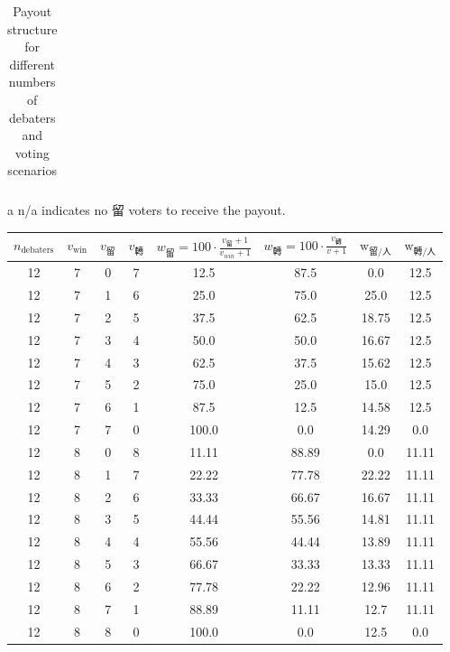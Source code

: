 \documentclass[9pt]{article}
\begin{document}
\begin{table}[h]
\begin{threeparttable}
\begin{tabular}{cccccccc}
\bottomrule
\end{tabular}
\begin{tablenotes}
    \item[a] n/a indicates no 留 voters to receive the payout.
\end{tablenotes}
\caption{Payout structure for different numbers of debaters and voting scenarios}
\end{threeparttable}
\end{table}




\begin{table}[h]
    \centering
    \small
    \begin{threeparttable}
    \begin{tabular}{cccccccc}
    \toprule    \toprule
    $n_{\text{debaters}}$ & $v_{\text{win}}$ & $v_{\text{留}}$ & $v_{\text{轉}}$ & $w_{\text{留}} = 100 \cdot \frac{v_{\text{留}}+1}{v_{win}+1} $ & $w_{\text{轉}} = 100\cdot\frac{v_{\text{轉}}}{v+1}$ & $\text{w}_{\text{留}/\text{人} }$ & $\text{w}_{\text{轉}/\text{人}}$ \\
    \midrule
12 & 7 & 0 & 7 & 12.5 & 87.5 & 0.0 & 12.5 \\
12 & 7 & 1 & 6 & 25.0 & 75.0 & 25.0 & 12.5 \\
12 & 7 & 2 & 5 & 37.5 & 62.5 & 18.75 & 12.5 \\
12 & 7 & 3 & 4 & 50.0 & 50.0 & 16.67 & 12.5 \\
12 & 7 & 4 & 3 & 62.5 & 37.5 & 15.62 & 12.5 \\
12 & 7 & 5 & 2 & 75.0 & 25.0 & 15.0 & 12.5 \\
12 & 7 & 6 & 1 & 87.5 & 12.5 & 14.58 & 12.5 \\
12 & 7 & 7 & 0 & 100.0 & 0.0 & 14.29 & 0.0 \\
12 & 8 & 0 & 8 & 11.11 & 88.89 & 0.0 & 11.11 \\
12 & 8 & 1 & 7 & 22.22 & 77.78 & 22.22 & 11.11 \\
12 & 8 & 2 & 6 & 33.33 & 66.67 & 16.67 & 11.11 \\
12 & 8 & 3 & 5 & 44.44 & 55.56 & 14.81 & 11.11 \\
12 & 8 & 4 & 4 & 55.56 & 44.44 & 13.89 & 11.11 \\
12 & 8 & 5 & 3 & 66.67 & 33.33 & 13.33 & 11.11 \\
12 & 8 & 6 & 2 & 77.78 & 22.22 & 12.96 & 11.11 \\
12 & 8 & 7 & 1 & 88.89 & 11.11 & 12.7 & 11.11 \\
12 & 8 & 8 & 0 & 100.0 & 0.0 & 12.5 & 0.0 \\

\end{tabular}
\end{threeparttable}
\end{table}
\end{document}
